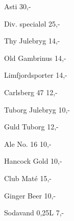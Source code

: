 \documentclass{article}
\begin{document}

\maketitle

\null
\vspace{-0.8cm}


\vspace{0.5cm}

Asti \hfill 30,-

\vspace{0.3cm}

Div. specialøl \hfill 25,-

\vspace{1.3cm}

Thy Julebryg \hfill 14,-

\vspace{0.3cm}

Old Gambrinus \hfill 14,-

\vspace{0.3cm}

Limfjordsporter \hfill 14,-

\vspace{0.3cm}

Carlsberg 47 \hfill 12,-

\vspace{0.3cm}

Tuborg Julebryg \hfill 10,-

\vspace{1.3cm}

Guld Tuborg \hfill 12,-

\vspace{0.3cm}

Ale No. 16 \hfill 10,-

\vspace{0.3cm}

Hancock Gold \hfill 10,-

\vspace{1.3cm}

Club Maté \hfill 15,-

\vspace{0.3cm}

Ginger Beer \hfill 10,-

\vspace{0.3cm}

Sodavand 0,25L \hfill 7,-

\vspace{0.5cm}

\underskriv
\end{document}
